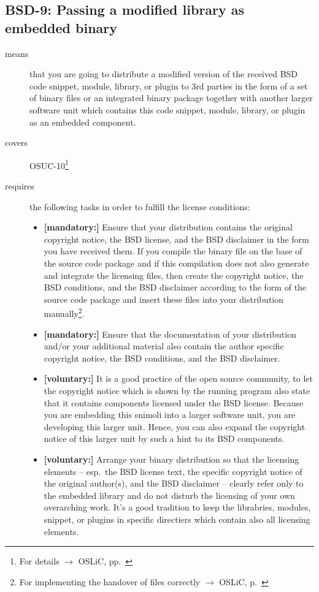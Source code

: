 \subsection{BSD-9: Passing a modified library as embedded binary}

\begin{description}
\item[means] that you are going to distribute a modified version of the received
BSD code snippet, module, library, or plugin to 3rd parties in the form of a set of
binary files or an integrated binary package together with another larger
software unit which contains this code snippet, module, library, or plugin as
an embedded component.
\item[covers] OSUC-10\footnote{For details $\rightarrow$ OSLiC, pp.\ \pageref{OSUC-10-DEF}}
\item[requires] the following tasks in order to fulfill the license conditions:
\begin{itemize}
  \item  \textbf{[mandatory:]} Ensure that your distribution contains the
  original copyright notice, the BSD license, and the BSD disclaimer in the form
  you have received them. If you compile the binary file on the base of the
  source code package and if this compilation does not also generate and
  integrate the licensing files, then create the copyright notice, the BSD
  conditions, and the BSD disclaimer according to the form of the source code
  package and insert these files into your distribution manually\footnote{For
  implementing the handover of files correctly $\rightarrow$ OSLiC, p.\
  \pageref{DistributingFilesHint}}.
  \item  \textbf{[mandatory:]} Ensure that the documentation of your
  distribution and/or your additional material also contain the author specific
  copyright notice, the BSD conditions, and the BSD disclaimer.
 \item \textbf{[voluntary:]} It is a good practice of the open source
  community, to let the copyright notice which is shown by the running program
  also state that it contains components licensed under the BSD license. Because
  you are embedding this snimoli into a larger software unit, you are
  developing this larger unit. Hence, you can also expand the copyright notice
  of this larger unit by such a hint to its BSD components.
  
  \item \textbf{[voluntary:]} Arrange your binary distribution so that the
  licensing elements -- esp.\ the BSD license text, the specific copyright
  notice of the original author(s), and the BSD disclaimer -- clearly refer
  only to the embedded library and do not disturb the licensing of your own
  overarching work. It's a good tradition to keep the librabries, modules,
  snippet, or plugins in specific directiers which contain also all licensing
  elements.
\end{itemize}


\end{description}
